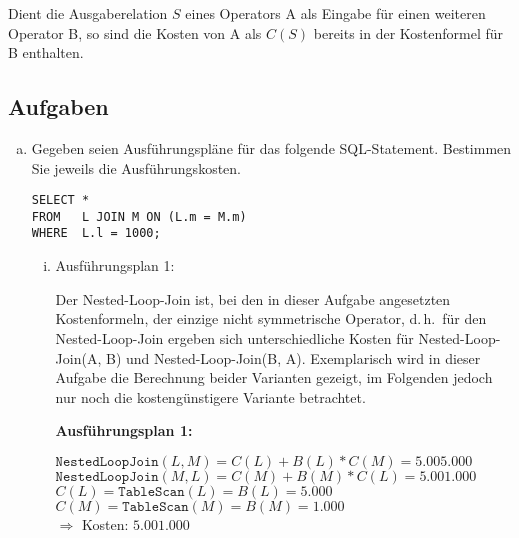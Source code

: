 Dient die Ausgaberelation $S$ eines Operators A als Eingabe für einen weiteren Operator B, so sind die Kosten von A als $C(S)$ bereits in der Kostenformel für B enthalten.


\subsection*{Aufgaben}

\begin{enumerate}[a)]

	\item Gegeben seien Ausführungspläne für das folgende SQL-Statement.
	Bestimmen Sie jeweils die Ausführungskosten.

	\begin{lstlisting}
SELECT *
FROM   L JOIN M ON (L.m = M.m)
WHERE  L.l = 1000;
	\end{lstlisting}

	\begin{enumerate}[i)]

\item
Ausführungsplan 1:


\begin{solution}
Der Nested-Loop-Join ist, bei den in dieser Aufgabe angesetzten Kostenformeln, der einzige nicht symmetrische Operator, d.\,h.\ für den Nested-Loop-Join ergeben sich unterschiedliche Kosten für Nested-Loop-Join(A, B) und Nested-Loop-Join(B, A).
Exemplarisch wird in dieser Aufgabe die Berechnung beider Varianten gezeigt, im Folgenden jedoch nur noch die kostengünstigere Variante betrachtet.

	\textbf{Ausführungsplan 1:}

	$\mathtt{NestedLoopJoin}(L, M) = C(L) + B(L) * C(M) = 5.005.000$ \\
	$\mathtt{NestedLoopJoin}(M, L) = C(M) + B(M) * C(L) = 5.001.000$ \\
	$C(L) =\mathtt{ TableScan}(L) = B(L) = 5.000$ \\
	$C(M) = \mathtt{TableScan}(M) = B(M) = 1.000$ \\
	$\Rightarrow$ Kosten: $5.001.000$ \\
	\end{solution}


\end{enumerate}
\end{enumerate}
